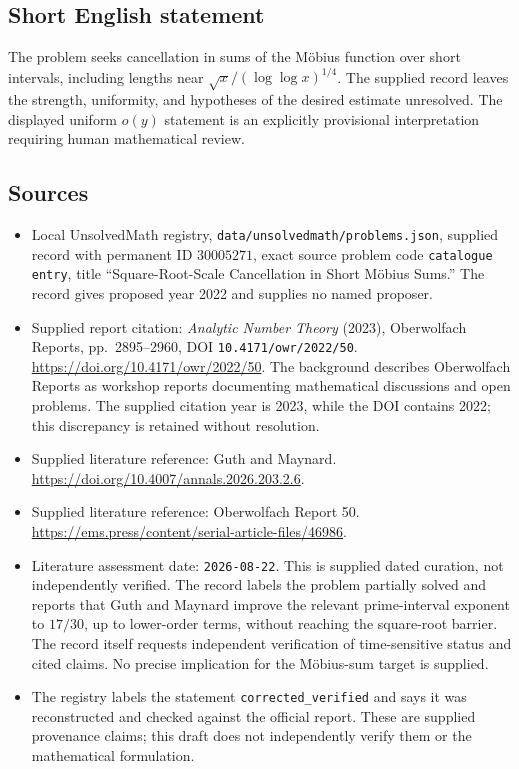 \documentclass[11pt]{article}
\begin{document}
\subsection{Short English statement}
The problem seeks cancellation in sums of the Möbius function over short intervals, including lengths near \(\sqrt{x}/(\log\log x)^{1/4}\). The supplied record leaves the strength, uniformity, and hypotheses of the desired estimate unresolved. The displayed uniform \(o(y)\) statement is an explicitly provisional interpretation requiring human mathematical review.
\subsection{Sources}
\begin{itemize}
\item Local UnsolvedMath registry, \texttt{data/unsolvedmath/problems.json}, supplied record with permanent ID \(30005271\), exact source problem code \texttt{catalogue entry}, title ``Square-Root-Scale Cancellation in Short Möbius Sums.'' The record gives proposed year 2022 and supplies no named proposer.
\item Supplied report citation: \emph{Analytic Number Theory} (2023), Oberwolfach Reports, pp.~2895--2960, DOI \texttt{10.4171/owr/2022/50}. \url{https://doi.org/10.4171/owr/2022/50}. The background describes Oberwolfach Reports as workshop reports documenting mathematical discussions and open problems. The supplied citation year is 2023, while the DOI contains 2022; this discrepancy is retained without resolution.
\item Supplied literature reference: Guth and Maynard. \url{https://doi.org/10.4007/annals.2026.203.2.6}.
\item Supplied literature reference: Oberwolfach Report 50. \url{https://ems.press/content/serial-article-files/46986}.
\item Literature assessment date: \texttt{2026-08-22}. This is supplied dated curation, not independently verified. The record labels the problem partially solved and reports that Guth and Maynard improve the relevant prime-interval exponent to \(17/30\), up to lower-order terms, without reaching the square-root barrier. The record itself requests independent verification of time-sensitive status and cited claims. No precise implication for the Möbius-sum target is supplied.
\item The registry labels the statement \texttt{corrected\_verified} and says it was reconstructed and checked against the official report. These are supplied provenance claims; this draft does not independently verify them or the mathematical formulation.
\end{itemize}
\end{document}
